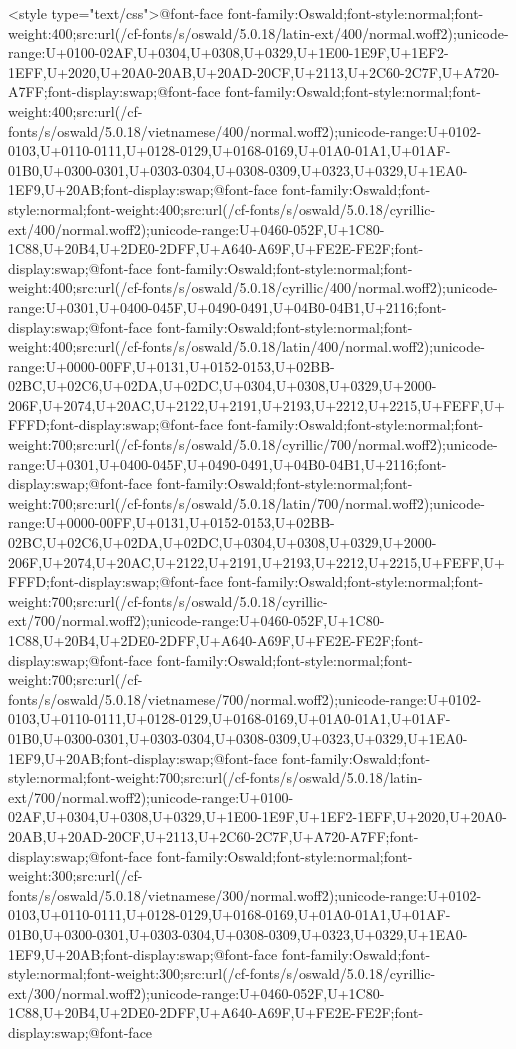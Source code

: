 <style type="text/css">@font-face {font-family:Oswald;font-style:normal;font-weight:400;src:url(/cf-fonts/s/oswald/5.0.18/latin-ext/400/normal.woff2);unicode-range:U+0100-02AF,U+0304,U+0308,U+0329,U+1E00-1E9F,U+1EF2-1EFF,U+2020,U+20A0-20AB,U+20AD-20CF,U+2113,U+2C60-2C7F,U+A720-A7FF;font-display:swap;}@font-face {font-family:Oswald;font-style:normal;font-weight:400;src:url(/cf-fonts/s/oswald/5.0.18/vietnamese/400/normal.woff2);unicode-range:U+0102-0103,U+0110-0111,U+0128-0129,U+0168-0169,U+01A0-01A1,U+01AF-01B0,U+0300-0301,U+0303-0304,U+0308-0309,U+0323,U+0329,U+1EA0-1EF9,U+20AB;font-display:swap;}@font-face {font-family:Oswald;font-style:normal;font-weight:400;src:url(/cf-fonts/s/oswald/5.0.18/cyrillic-ext/400/normal.woff2);unicode-range:U+0460-052F,U+1C80-1C88,U+20B4,U+2DE0-2DFF,U+A640-A69F,U+FE2E-FE2F;font-display:swap;}@font-face {font-family:Oswald;font-style:normal;font-weight:400;src:url(/cf-fonts/s/oswald/5.0.18/cyrillic/400/normal.woff2);unicode-range:U+0301,U+0400-045F,U+0490-0491,U+04B0-04B1,U+2116;font-display:swap;}@font-face {font-family:Oswald;font-style:normal;font-weight:400;src:url(/cf-fonts/s/oswald/5.0.18/latin/400/normal.woff2);unicode-range:U+0000-00FF,U+0131,U+0152-0153,U+02BB-02BC,U+02C6,U+02DA,U+02DC,U+0304,U+0308,U+0329,U+2000-206F,U+2074,U+20AC,U+2122,U+2191,U+2193,U+2212,U+2215,U+FEFF,U+FFFD;font-display:swap;}@font-face {font-family:Oswald;font-style:normal;font-weight:700;src:url(/cf-fonts/s/oswald/5.0.18/cyrillic/700/normal.woff2);unicode-range:U+0301,U+0400-045F,U+0490-0491,U+04B0-04B1,U+2116;font-display:swap;}@font-face {font-family:Oswald;font-style:normal;font-weight:700;src:url(/cf-fonts/s/oswald/5.0.18/latin/700/normal.woff2);unicode-range:U+0000-00FF,U+0131,U+0152-0153,U+02BB-02BC,U+02C6,U+02DA,U+02DC,U+0304,U+0308,U+0329,U+2000-206F,U+2074,U+20AC,U+2122,U+2191,U+2193,U+2212,U+2215,U+FEFF,U+FFFD;font-display:swap;}@font-face {font-family:Oswald;font-style:normal;font-weight:700;src:url(/cf-fonts/s/oswald/5.0.18/cyrillic-ext/700/normal.woff2);unicode-range:U+0460-052F,U+1C80-1C88,U+20B4,U+2DE0-2DFF,U+A640-A69F,U+FE2E-FE2F;font-display:swap;}@font-face {font-family:Oswald;font-style:normal;font-weight:700;src:url(/cf-fonts/s/oswald/5.0.18/vietnamese/700/normal.woff2);unicode-range:U+0102-0103,U+0110-0111,U+0128-0129,U+0168-0169,U+01A0-01A1,U+01AF-01B0,U+0300-0301,U+0303-0304,U+0308-0309,U+0323,U+0329,U+1EA0-1EF9,U+20AB;font-display:swap;}@font-face {font-family:Oswald;font-style:normal;font-weight:700;src:url(/cf-fonts/s/oswald/5.0.18/latin-ext/700/normal.woff2);unicode-range:U+0100-02AF,U+0304,U+0308,U+0329,U+1E00-1E9F,U+1EF2-1EFF,U+2020,U+20A0-20AB,U+20AD-20CF,U+2113,U+2C60-2C7F,U+A720-A7FF;font-display:swap;}@font-face {font-family:Oswald;font-style:normal;font-weight:300;src:url(/cf-fonts/s/oswald/5.0.18/vietnamese/300/normal.woff2);unicode-range:U+0102-0103,U+0110-0111,U+0128-0129,U+0168-0169,U+01A0-01A1,U+01AF-01B0,U+0300-0301,U+0303-0304,U+0308-0309,U+0323,U+0329,U+1EA0-1EF9,U+20AB;font-display:swap;}@font-face {font-family:Oswald;font-style:normal;font-weight:300;src:url(/cf-fonts/s/oswald/5.0.18/cyrillic-ext/300/normal.woff2);unicode-range:U+0460-052F,U+1C80-1C88,U+20B4,U+2DE0-2DFF,U+A640-A69F,U+FE2E-FE2F;font-display:swap;}@font-face 